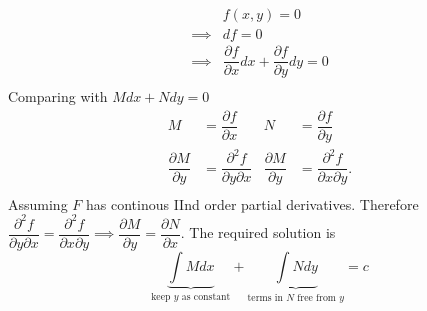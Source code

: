 \documentclass[a4paper, titlepage]{article}
\begin{document}
        \begin{align*}
            & f(x, y) = 0 \\
            \implies & df = 0 \\
            \implies & \dfrac{\partial f}{\partial x} dx + \dfrac{\partial f}{\partial y} dy = 0 \\
        \end{align*}
        Comparing with $Mdx + Ndy = 0$
        \begin{align*}
            M &= \dfrac{\partial f}{\partial x} & N &= \dfrac{\partial f}{\partial y} \\
            \dfrac{\partial M}{\partial y} &= \dfrac{\partial^2 f}{\partial y \partial x} &
            \dfrac{\partial M}{\partial y} &= \dfrac{\partial^2 f}{\partial x \partial y}. \\
        \end{align*}
        Assuming $F$ has continous IInd order partial derivatives.
        Therefore $\dfrac{\partial^2 f}{\partial y \partial x} = \dfrac{\partial^2 f}{\partial x \partial y} \implies \dfrac{\partial M}{\partial y} = \dfrac{\partial N}{\partial x}.$
        The required solution is $$\underbrace{\displaystyle\int M dx}_{\text{keep $y$ as constant}} + \underbrace{\displaystyle\int N dy}_{\text{terms in } N \text{ free from } y} = c$$
\end{document}
